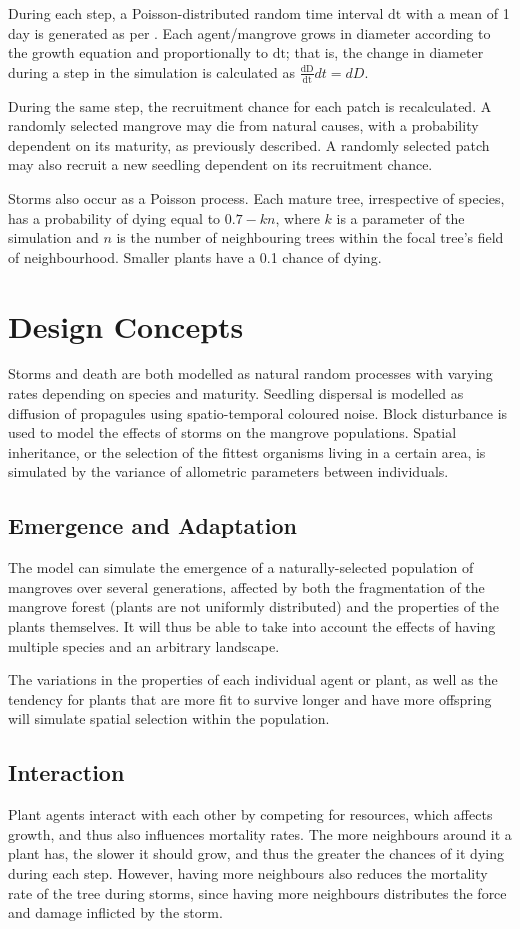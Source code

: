 During each step, a Poisson-distributed random time interval \(\text{dt}\) 
with a mean of 1 day is generated as per \cite{SalmoJuanico2015}. Each
agent/mangrove grows in diameter according to the growth equation and
proportionally to \(\text{dt}\); that is, the change in diameter during a
step in the simulation is calculated as \(\frac{\text{dD}}{\text{dt}}dt = dD\).

During the same step, the recruitment chance for each patch is
recalculated. A randomly selected mangrove may die from natural
causes, with a probability dependent on its maturity, as previously described. A randomly
selected patch may also recruit a new seedling dependent on its
recruitment chance.

Storms also occur as a Poisson process. Each mature tree, irrespective
of species, has a probability of dying equal to \(0.7 - kn\),
where \(k\) is a parameter of the simulation and \(n\) is the number of
neighbouring trees within the focal tree's field of neighbourhood. Smaller
plants have a 0.1 chance of dying.

\section{Design Concepts}

Storms and death are both modelled as natural random processes with
varying rates depending on species and maturity. Seedling dispersal is
modelled as diffusion of propagules using spatio-temporal coloured noise.
Block disturbance is used to model the effects of storms on the mangrove
populations. Spatial inheritance, or the selection of the fittest organisms living
in a certain area, is simulated by the variance of allometric parameters
between individuals.

\subsection{Emergence and Adaptation}
The model can simulate the emergence of a naturally-selected population
of mangroves over several generations, affected by both the
fragmentation of the mangrove forest (plants are not uniformly
distributed) and the properties of the plants themselves. It will thus
be able to take into account the effects of having multiple species and
an arbitrary landscape.

The variations in the properties of each individual agent or plant, as
well as the tendency for plants that are more fit to survive longer and
have more offspring will simulate spatial selection within the
population.

\subsection{Interaction}
Plant agents interact with each other by competing for resources, which
affects growth, and thus also influences mortality rates. The more
neighbours around it a plant has, the slower it should grow, and thus the
greater the chances of it dying during each step. However, having more
neighbours also reduces the mortality rate of the tree during storms,
since having more neighbours distributes the force and damage inflicted
by the storm.
